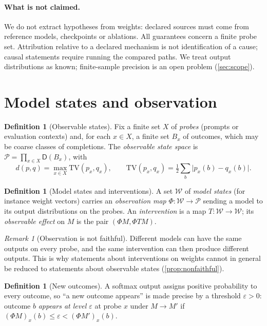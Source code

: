 \documentclass[11pt]{article}
\theoremstyle{definition}
\newtheorem{definition}[theorem]{Definition}
\theoremstyle{remark}
\newtheorem{remark}[theorem]{Remark}
\newcommand{\D}{\mathsf{D}}
\newcommand{\TV}{\mathrm{TV}}
\newcommand{\cP}{\mathcal{P}}
\newcommand{\cW}{\mathcal{W}}
\begin{document}
\paragraph{What is not claimed.} We do not extract hypotheses from weights: declared sources must
come from reference models, checkpoints or ablations. All guarantees concern a finite probe set.
Attribution relative to a declared mechanism is not identification of a cause; causal statements
require running the compared paths. We treat output distributions as known; finite-sample precision
is an open problem (\cref{sec:scope}).

\section{Model states and observation}\label{sec:states}

\begin{definition}[Observable states]\label{def:obs}
Fix a finite set $X$ of \emph{probes} (prompts or evaluation contexts) and, for each $x\in X$, a
finite set $B_x$ of outcomes, which may be coarse classes of completions. The \emph{observable state
space} is $\cP=\prod_{x\in X}\D(B_x)$, with
\[
d(p,q)=\max_{x\in X}\TV(p_x,q_x),\qquad \TV(p_x,q_x)=\tfrac12\textstyle\sum_b\lvert p_x(b)-q_x(b)\rvert .
\]
\end{definition}

\begin{definition}[Model states and interventions]
A set $\cW$ of \emph{model states} (for instance weight vectors) carries an \emph{observation map}
$\Phi\colon\cW\to\cP$ sending a model to its output distributions on the probes. An
\emph{intervention} is a map $T\colon\cW\to\cW$; its \emph{observable effect} on $M$ is the pair
$(\Phi M,\Phi TM)$.
\end{definition}

\begin{remark}[Observation is not faithful]
Different models can have the same outputs on every probe, and the same intervention can then
produce different outputs. This is why statements about interventions on weights cannot in general be
reduced to statements about observable states (\cref{prop:nonfaithful}).
\end{remark}

\begin{definition}[New outcomes]
A softmax output assigns positive probability to every outcome, so ``a new outcome appears'' is made
precise by a threshold $\varepsilon>0$: outcome $b$ \emph{appears at level $\varepsilon$} at probe
$x$ under $M\to M'$ if $(\Phi M)_x(b)\le\varepsilon<(\Phi M')_x(b)$.
\end{definition}
\end{document}
